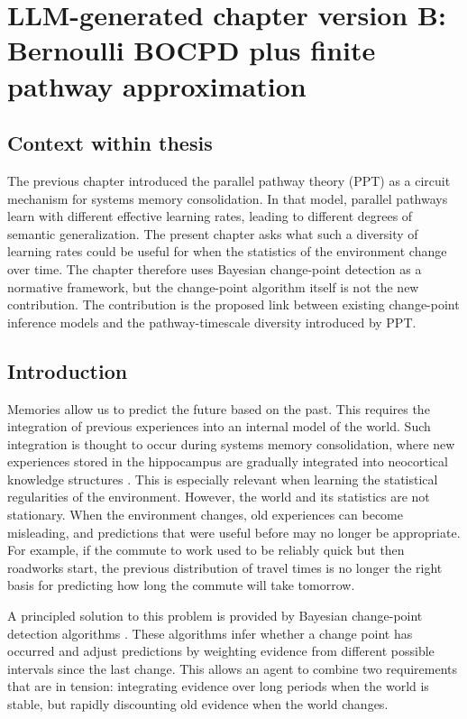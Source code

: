 
\section{LLM-generated chapter version B: Bernoulli BOCPD plus finite pathway approximation}
\label{sec:cpd-llm-version-b}

\subsection{Context within thesis}
\label{sec:cpd-b-context}

The previous chapter introduced the parallel pathway theory (PPT) as a circuit mechanism for systems memory consolidation. In that model, parallel pathways learn with different effective learning rates, leading to different degrees of semantic generalization. The present chapter asks what such a diversity of learning rates could be useful for when the statistics of the environment change over time. The chapter therefore uses Bayesian change-point detection as a normative framework, but the change-point algorithm itself is not the new contribution. The contribution is the proposed link between existing change-point inference models and the pathway-timescale diversity introduced by PPT.

\subsection{Introduction}
\label{sec:cpd-b-introduction}

Memories allow us to predict the future based on the past. This requires the integration of previous experiences into an internal model of the world. Such integration is thought to occur during systems memory consolidation, where new experiences stored in the hippocampus are gradually integrated into neocortical knowledge structures \citep{McClelland1995}. This is especially relevant when learning the statistical regularities of the environment. However, the world and its statistics are not stationary. When the environment changes, old experiences can become misleading, and predictions that were useful before may no longer be appropriate. For example, if the commute to work used to be reliably quick but then roadworks start, the previous distribution of travel times is no longer the right basis for predicting how long the commute will take tomorrow.

A principled solution to this problem is provided by Bayesian change-point detection algorithms \citep{Adams2007}. These algorithms infer whether a change point has occurred and adjust predictions by weighting evidence from different possible intervals since the last change. This allows an agent to combine two requirements that are in tension: integrating evidence over long periods when the world is stable, but rapidly discounting old evidence when the world changes.

